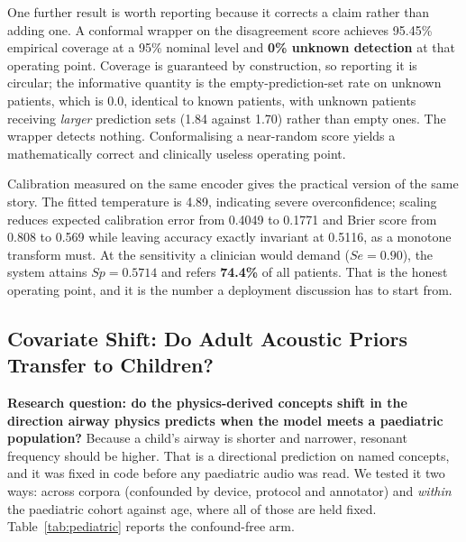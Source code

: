 \documentclass[journal,onecolumn]{IEEEtran}
\newcommand{\best}[1]{\textbf{#1}}
\begin{document}
One further result is worth reporting because it corrects a claim rather than
adding one. A conformal wrapper on the disagreement score achieves 95.45\%
empirical coverage at a 95\% nominal level and \best{0\% unknown detection} at that
operating point. Coverage is guaranteed by construction, so reporting it is
circular; the informative quantity is the empty-prediction-set rate on unknown
patients, which is 0.0, identical to known patients, with unknown patients
receiving \emph{larger} prediction sets (1.84 against 1.70) rather than empty ones.
The wrapper detects nothing. Conformalising a near-random score yields a
mathematically correct and clinically useless operating point.

Calibration measured on the same encoder gives the practical version of the same
story. The fitted temperature is 4.89, indicating severe overconfidence; scaling
reduces expected calibration error from 0.4049 to 0.1771 and Brier score from
0.808 to 0.569 while leaving accuracy exactly invariant at 0.5116, as a monotone
transform must. At the sensitivity a clinician would demand ($Se = 0.90$), the
system attains $Sp = 0.5714$ and refers \best{74.4\%} of all patients. That is the
honest operating point, and it is the number a deployment discussion has to start
from.

\subsection{Covariate Shift: Do Adult Acoustic Priors Transfer to Children?}
\label{subsec:pediatric}

\textbf{Research question: do the physics-derived concepts shift in the direction
airway physics predicts when the model meets a paediatric population?} Because a
child's airway is shorter and narrower, resonant frequency should be higher. That
is a directional prediction on named concepts, and it was fixed in code before any
paediatric audio was read. We tested it two ways: across corpora (confounded by
device, protocol and annotator) and \emph{within} the paediatric cohort against
age, where all of those are held fixed. Table~\ref{tab:pediatric} reports the
confound-free arm.
\end{document}
